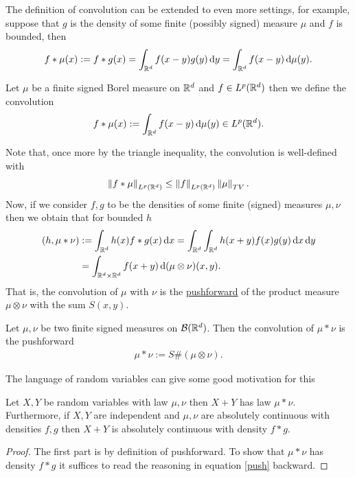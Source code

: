 \documentclass[
    a4paper,
    DIV=14,
    abstract=true,
    numbers=noenddot
]{scrartcl}
\begin{document}
The definition of convolution can be extended to even more settings, for example, suppose that $g $ is the density of some finite (possibly signed) measure $\mu$ and  $f$ is bounded, then
\begin{align*}
	f*\mu(x):= f*g(x)= \int_{\mathbb{R}^d}f(x-y) g(y)\,\mathrm{d} y = \int_{\mathbb{R}^d} f(x-y)\,\mathrm{d} \mu (y) .
\end{align*}
\begin{definition}
	Let $\mu $ be a finite signed Borel measure on $\mathbb{R}^d$ and  $f \in L^p(\mathbb{R}^d)$ then we define the convolution
	\begin{align*}
		f*\mu (x) :=\int_{\mathbb{R}^d} f(x-y)\,\mathrm{d} \mu (y) \in L^p(\mathbb{R}^d).
	\end{align*}
\end{definition}
Note that, once more by the triangle inequality, the convolution is well-defined with
\begin{align*}
	\left\lVert f* \mu  \right\rVert_{L^p(\mathbb{R}^d)} \leq \left\lVert f \right\rVert_{L^p(\mathbb{R}^d)} \left\lVert \mu  \right\rVert_{TV} .
\end{align*}
Now, if we consider $f,g$ to be the densities of some finite (signed) measures  $\mu,\nu$ then we obtain that for bounded $h$
\begin{align}\label{push}
	(h, \mu *\nu) & := \int_{\mathbb{R}^d} h(x) f*g(x) \,\mathrm{d} x = \int_{\mathbb{R}^d}\int_{\mathbb{R}^d}  h(x+y) f(x)  g(y)\,\mathrm{d} x \,\mathrm{d} y \\
	              & = \int_{\mathbb{R}^d \times\mathbb{R}^d} f(x+y) \,\mathrm{d} (\mu \otimes \nu)(x,y)\notag .
\end{align}
That is, the convolution of $\mu$ with $\nu$ is the \href{https://en.wikipedia.org/wiki/Pushforward_measure}{pushforward}  of the product measure $\mu \otimes \nu$ with the sum $S(x,y)$.
\begin{definition}
	Let $\mu ,\nu$ be two finite signed measures on $\mathcal{B}(\mathbb{R}^d)$. Then the convolution of  $\mu *\nu$ is the pushforward
	\begin{align*}
		\mu *\nu := S\# (\mu \otimes\nu).
	\end{align*}
\end{definition}
The language of random variables can give some good motivation for this
\begin{example}
	Let $X,Y$ be random variables with law  $\mu ,\nu$ then $X+Y$ has law  $\mu *\nu$. Furthermore, if $X, Y$ are independent and $\mu,\nu$ are absolutely continuous with densities $f,g$ then $X+Y$ is absolutely continuous with density $f*g$.
\end{example}
\begin{proof}
	The first part is by definition of pushforward. To show that  $\mu *\nu$ has density $f*g$  it suffices to read the reasoning in equation  \eqref{push} backward.
\end{proof}
\end{document}

